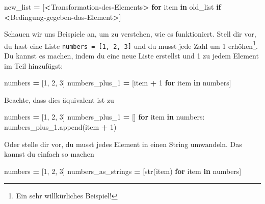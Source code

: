 \documentclass[
]{book}
\newenvironment{Shaded}{\begin{snugshade}}{\end{snugshade}}
\newcommand{\BuiltInTok}[1]{#1}
\newcommand{\ControlFlowTok}[1]{\textcolor[rgb]{0.13,0.29,0.53}{\textbf{#1}}}
\newcommand{\DecValTok}[1]{\textcolor[rgb]{0.00,0.00,0.81}{#1}}
\newcommand{\KeywordTok}[1]{\textcolor[rgb]{0.13,0.29,0.53}{\textbf{#1}}}
\newcommand{\NormalTok}[1]{#1}
\newcommand{\OperatorTok}[1]{\textcolor[rgb]{0.81,0.36,0.00}{\textbf{#1}}}
\begin{document}
\begin{Shaded}
\begin{Highlighting}[]
\NormalTok{new\_list }\OperatorTok{=}\NormalTok{ [}\OperatorTok{\textless{}}\NormalTok{Transformation}\OperatorTok{{-}}\NormalTok{des}\OperatorTok{{-}}\NormalTok{Elements}\OperatorTok{\textgreater{}} \ControlFlowTok{for}\NormalTok{ item }\KeywordTok{in}\NormalTok{ old\_list }\ControlFlowTok{if} \OperatorTok{\textless{}}\NormalTok{Bedingung}\OperatorTok{{-}}\NormalTok{gegeben}\OperatorTok{{-}}\NormalTok{das}\OperatorTok{{-}}\NormalTok{Element}\OperatorTok{\textgreater{}}\NormalTok{]}
\end{Highlighting}
\end{Shaded}

Schauen wir uns Beispiele an, um zu verstehen, wie es funktioniert. Stell dir vor, du hast eine Liste \texttt{numbers\ =\ {[}1,\ 2,\ 3{]}} und du musst jede Zahl um 1 erhöhen\footnote{Ein sehr willkürliches Beispiel!}. Du kannst es machen, indem du eine neue Liste erstellst und 1 zu jedem Element im Teil hinzufügst:

\begin{Shaded}
\begin{Highlighting}[]
\NormalTok{numbers }\OperatorTok{=}\NormalTok{ [}\DecValTok{1}\NormalTok{, }\DecValTok{2}\NormalTok{, }\DecValTok{3}\NormalTok{]}
\NormalTok{numbers\_plus\_1 }\OperatorTok{=}\NormalTok{ [item }\OperatorTok{+} \DecValTok{1} \ControlFlowTok{for}\NormalTok{ item }\KeywordTok{in}\NormalTok{ numbers]}
\end{Highlighting}
\end{Shaded}

Beachte, dass dies äquivalent ist zu

\begin{Shaded}
\begin{Highlighting}[]
\NormalTok{numbers }\OperatorTok{=}\NormalTok{ [}\DecValTok{1}\NormalTok{, }\DecValTok{2}\NormalTok{, }\DecValTok{3}\NormalTok{]}
\NormalTok{numbers\_plus\_1 }\OperatorTok{=}\NormalTok{ []}
\ControlFlowTok{for}\NormalTok{ item }\KeywordTok{in}\NormalTok{ numbers:}
\NormalTok{    numbers\_plus\_1.append(item }\OperatorTok{+} \DecValTok{1}\NormalTok{)}
\end{Highlighting}
\end{Shaded}

Oder stelle dir vor, du musst jedes Element in einen String umwandeln. Das kannst du einfach so machen

\begin{Shaded}
\begin{Highlighting}[]
\NormalTok{numbers }\OperatorTok{=}\NormalTok{ [}\DecValTok{1}\NormalTok{, }\DecValTok{2}\NormalTok{, }\DecValTok{3}\NormalTok{]}
\NormalTok{numbers\_as\_strings }\OperatorTok{=}\NormalTok{ [}\BuiltInTok{str}\NormalTok{(item) }\ControlFlowTok{for}\NormalTok{ item }\KeywordTok{in}\NormalTok{ numbers]}
\end{Highlighting}
\end{Shaded}
\end{document}
